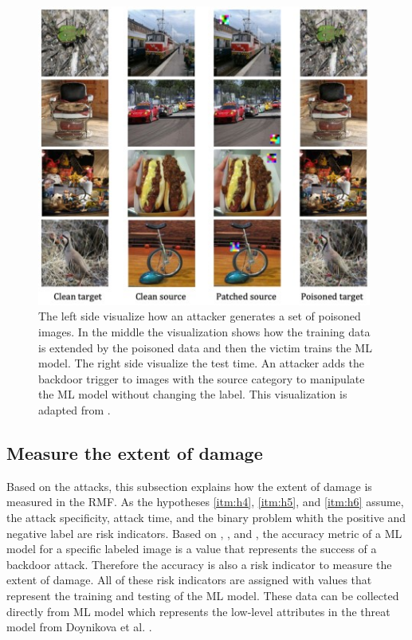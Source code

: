 \begin{figure}[ht!]
  \centering
  \includegraphics[width=11cm]{pictures/poisoned_hidden_trigger.jpg}
  \caption{The left side visualize how an attacker generates a set of poisoned images. In the middle the visualization shows how the training data is extended by the poisoned data and then the victim trains the ML model. The right side visualize the test time. An attacker adds the backdoor trigger to images with the source category to manipulate the ML model without changing the label. This visualization is adapted from \cite{DBLP:journals/corr/abs-1910-00033}.}
  \label{fig:poisoned_hidden_trigger}
\end{figure}

\subsection{Measure the extent of damage}
\label{sec:ext_dmg}

Based on the attacks, this subsection explains how the extent of damage is measured in the RMF. As the hypotheses \ref{itm:h4}, \ref{itm:h5}, and \ref{itm:h6} assume, the attack specificity, attack time, and the binary problem whith the positive and negative label are risk indicators. Based on \cite{DBLP:journals/corr/abs-1708-06733}, \cite{turner2018clean}, and \cite{DBLP:journals/corr/abs-1910-00033}, the accuracy metric of a ML model for a specific labeled image is a value that represents the success of a backdoor attack. Therefore the accuracy is also a risk indicator to measure the extent of damage. All of these risk indicators are assigned with values that represent the training and testing of the ML model. These data can be collected directly from ML model which represents the low-level attributes in the threat model from Doynikova et al. \cite{DBLP:conf/crisis/DoynikovaNGK20}.

